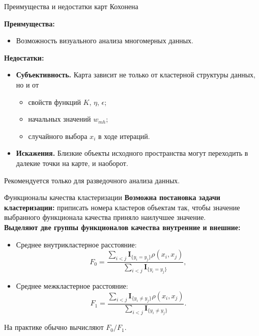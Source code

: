 \documentclass{beamer}
\begin{document}
\begin{frame}{Преимущества и недостатки карт Кохонена}

	\textbf{Преимущества:}
	\begin{itemize}
		\item Возможность визуального анализа многомерных данных.
	\end{itemize}
	\vspace{.5cm}
	\textbf{Недостатки:}
	\begin{itemize}
		\item {\bf Субъективность.} Карта зависит не только от кластерной структуры данных, но и от
		\begin{itemize}
			\item свойств функций $K$, $\eta$, $\epsilon$;
			\item начальных значений $w_{mh}$;
			\item случайного выбора $x_i$ в ходе итераций.
		\end{itemize}
		\item {\bf Искажения.} Близкие объекты исходного пространства могут переходить в далекие точки на карте, и наоборот.
	\end{itemize}
	\vspace{.35cm}
	Рекомендуется только для разведочного анализа данных.
\end{frame}

\begin{frame}{Функционалы качества кластеризации}
   \textbf{Возможна постановка задачи кластеризации:} приписать номера кластеров объектам так, чтобы значение выбранного функционала качества приняло наилучшее значение.\\
   \vspace{4\ex}
   \textbf{Выделяют две группы функционалов качества внутренние и внешние:}
   \begin{itemize}
       \item Среднее внутрикластерное расстояние: $$F_0 = \frac{\sum_{i < j}\mathbf{I}_{\{y_i = y_j\}}\rho(x_i, x_j)}{\sum_{i < j}\mathbf{I}_{\{y_i = y_j\}}},$$
       \item Среднее межкластерное расстояние: $$F_1 = \frac{\sum_{i < j}\mathbf{I}_{\{y_i \neq y_j\}}\rho(x_i, x_j)}{\sum_{i < j}\mathbf{I}_{\{y_i \neq y_j\}}}.$$
   \end{itemize}
   \vspace{4\ex}
   На практике обычно вычисляют $F_0/F_1$.
\end{frame}
\end{document}
